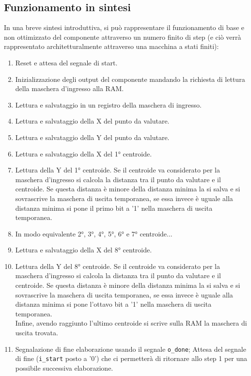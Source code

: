 \documentclass{article}
\begin{document}
\subsection{Funzionamento in sintesi}
In una breve sintesi introduttiva, si può rappresentare il funzionamento di base e non ottimizzato del componente attraverso un numero finito di step (e ciò verrà rappresentato architetturalmente attraverso una macchina a stati finiti):
\begin{enumerate}
    \item Reset e attesa del segnale di start.
    \item Inizializzazione degli output del componente mandando la richiesta di lettura della maschera d'ingresso alla RAM.
    \item Lettura e salvataggio in un registro della maschera di ingresso.
    \item Lettura e salvataggio della X del punto da valutare.
    \item Lettura e salvataggio della Y del punto da valutare.
    \item Lettura e salvataggio della X del 1° centroide.
    \item Lettura della Y del 1° centroide. Se il centroide va considerato per la maschera d'ingresso si calcola la distanza tra il punto da valutare e il centroide. Se questa distanza è minore della distanza minima la si salva e si sovrascrive la maschera di uscita temporanea, se essa invece è uguale alla distanza minima si pone il primo bit a '1' nella maschera di uscita temporanea.
    \item In modo equivalente 2°, 3°, 4°, 5°, 6° e 7° centroide... \addtocounter{enumi}{11}
    \item Lettura e salvataggio della X del 8° centroide.
    \item Lettura della Y del 8° centroide. Se il centroide va considerato per la maschera d'ingresso si calcola la distanza tra il punto da valutare e il centroide. Se questa distanza è minore della distanza minima la si salva e si sovrascrive la maschera di uscita temporanea, se essa invece è uguale alla distanza minima si pone l'ottavo bit a '1' nella maschera di uscita temporanea.\\
    Infine, avendo raggiunto l'ultimo centroide si scrive sulla RAM la maschera di uscita trovata.
    \item Segnalazione di fine elaborazione usando il segnale \verb^o_done^; Attesa del segnale di fine (\verb^i_start^ posto a '0') che ci permetterà di ritornare allo step 1 per una possibile successiva elaborazione.
\end{enumerate}
\end{document}
